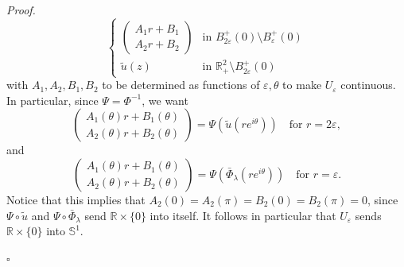 \documentclass[12pt, a4paper]{article}
\newenvironment{proof}{\noindent\emph{Proof.}}{\hfill$\square$\medskip}
\newcommand{\sph}{\mathbb{S}}
\newcommand{\R}{\mathbb{R}}
\newcommand{\ve}{\varepsilon}
\renewcommand{\(}{\left(}
\renewcommand{\)}{\right)}
\begin{document}
\begin{proof}
\begin{equation*}
\begin{cases}
\begin{pmatrix}
A_1r+B_1\\
A_2r+B_2
\end{pmatrix}&\text{in } B_{2\ve}^+(0)\setminus B_{\ve}^+(0)\\
\tilde u(z)&\text{in }\R^2_+\setminus B_{2\ve}^+(0)
\end{cases}
\end{equation*}
with $A_1,A_2,B_1,B_2$ to be determined as functions of $\ve,\theta$ to make $U_\ve$ continuous. In particular, since $\Psi=\Phi^{-1}$, we want
\begin{equation}\label{eq2ve}
\begin{pmatrix}
A_1(\theta)r+B_1(\theta)\\
A_2(\theta)r+B_2(\theta)
\end{pmatrix} =\Psi(\tilde u(re^{i\theta})) \quad \text{for }r=2\ve,
\end{equation}
and
\begin{equation}\label{eqve}
\begin{pmatrix}
A_1(\theta)r+B_1(\theta)\\
A_2(\theta)r+B_2(\theta)
\end{pmatrix} =\Psi(\bar \Phi_\lambda(re^{i\theta}))\quad \text{for }r=\ve.
\end{equation}
Notice that this implies that $A_2(0)=A_2(\pi)=B_2(0)=B_2(\pi)=0$, since $\Psi\circ \tilde u$ and $\Psi\circ \bar \Phi_\lambda$ send $\R\times\{0\}$ into itself. It follows in particular that $U_\ve$ sends $\R\times \{0\}$ into $\sph^1$.


\end{proof}
\end{document}

